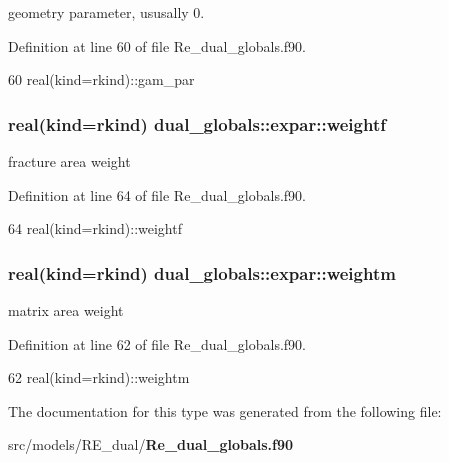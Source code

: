 geometry parameter, ususally 0. 



Definition at line 60 of file Re\+\_\+dual\+\_\+globals.\+f90.


\begin{DoxyCode}
60   \textcolor{keywordtype}{real(kind=rkind)}::gam\_par
\end{DoxyCode}
\subsubsection[{weightf}]{\setlength{\rightskip}{0pt plus 5cm}real(kind=rkind) dual\+\_\+globals\+::expar\+::weightf}\label{structdual__globals_1_1expar_a6d33ee08157a2b82a5afa6d43ddecd16}


fracture area weight 



Definition at line 64 of file Re\+\_\+dual\+\_\+globals.\+f90.


\begin{DoxyCode}
64   \textcolor{keywordtype}{real(kind=rkind)}::weightf
\end{DoxyCode}
\subsubsection[{weightm}]{\setlength{\rightskip}{0pt plus 5cm}real(kind=rkind) dual\+\_\+globals\+::expar\+::weightm}\label{structdual__globals_1_1expar_a02c1b8a24a88b787fb5a2c1821158b07}


matrix area weight 



Definition at line 62 of file Re\+\_\+dual\+\_\+globals.\+f90.


\begin{DoxyCode}
62   \textcolor{keywordtype}{real(kind=rkind)}::weightm
\end{DoxyCode}


The documentation for this type was generated from the following file\+:\begin{DoxyCompactItemize}
\item 
src/models/\+R\+E\+\_\+dual/{\bf Re\+\_\+dual\+\_\+globals.\+f90}\end{DoxyCompactItemize}
